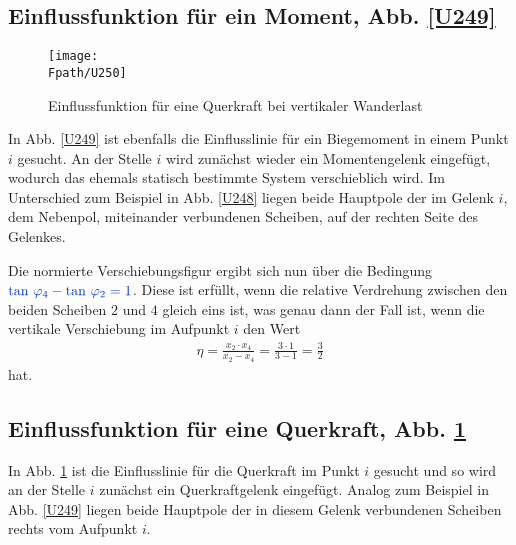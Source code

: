 {\textcolor{sectionTitleBlue}{\subsection{Einflussfunktion f\"{u}r ein Moment, Abb. \ref{U249}}}}
\begin{figure}[tbp]
\centering
\if {} \sidecaption \fi
\texttt{[image: \\Fpath/U250]}
\caption{Einflussfunktion f\"{u}r eine Querkraft bei vertikaler Wanderlast} \label{U250}
\end{figure}%
In Abb. \ref{U249} ist ebenfalls die Einflusslinie f\"{u}r ein Biegemoment in einem Punkt $i$ gesucht. An der Stelle $i$ wird zun\"{a}chst wieder ein Momentengelenk eingef\"{u}gt, wodurch das ehemals statisch bestimmte System verschieblich wird. Im Unterschied zum Beispiel in Abb. \ref{U248} liegen beide Hauptpole der im Gelenk $i$, dem Nebenpol, miteinander verbundenen Scheiben, auf der rechten Seite des Gelenkes.

Die normierte Verschiebungsfigur ergibt sich nun \"{u}ber die Bedingung $\textcolor{chapterTitleBlue}{\tan\,\Np_4 -\tan\,\Np_2=1}$. Diese ist erf\"{u}llt, wenn die relative Verdrehung zwischen den beiden Scheiben $2$ und $4$ gleich eins ist, was genau dann der Fall ist, wenn die vertikale Verschiebung im Aufpunkt $i$ den Wert
\begin{align}
\eta=\frac{x_2\cdot x_4 }{x_2-x_4}=\frac{3\cdot 1 }{3-1}=\frac{3 }{2}
\end{align}
hat.

{\textcolor{sectionTitleBlue}{\subsection{Einflussfunktion f\"{u}r eine Querkraft, Abb. \ref{U250}}}}

In Abb. \ref{U250} ist die Einflusslinie f\"{u}r die Querkraft im Punkt $i$ gesucht und so wird an der Stelle $i$ zun\"{a}chst ein Querkraftgelenk eingef\"{u}gt. Analog zum Beispiel in Abb. \ref{U249} liegen beide Hauptpole der in diesem Gelenk verbundenen Scheiben rechts vom Aufpunkt $i$.

